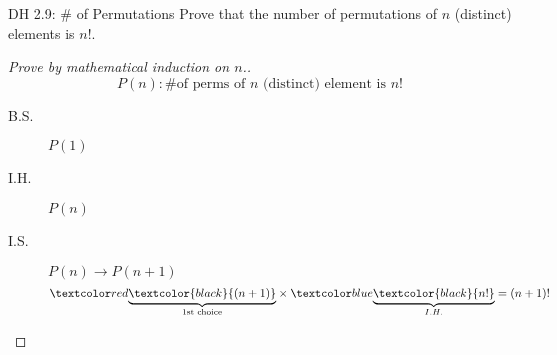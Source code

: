 \begin{frame}{}
  \begin{exampleblock}{DH 2.9: \# of Permutations}
    Prove that the number of permutations of $n$ (distinct) elements is $n!$.
  \end{exampleblock}

  \vspace{0.60cm}
  \begin{proof}[Prove by mathematical induction on $n$.]
    \[
      P(n): \text{\# of perms of } n \text{ (distinct) element is } n!
    \]

    \pause
    \begin{description}
      \item[B.S.] $P(1)$
      \item[I.H.] $P(n)$
      \item[I.S.] $P(n) \to P(n+1)$
	\pause
	\[
	  \red{\underbrace{\textcolor{black}{(n + 1)}}_{\text{1st choice}}} 
	  \times \blue{\underbrace{\textcolor{black}{n!}}_{I.H.}} = (n + 1)!
	\]
    \end{description}
  \end{proof}
\end{frame}

% 

